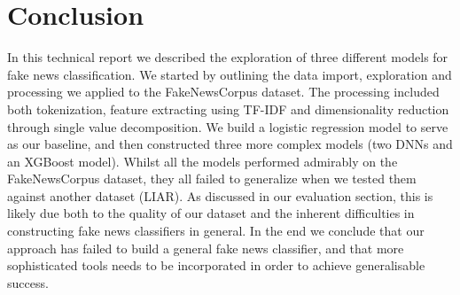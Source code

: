 \section{Conclusion}
In this technical report we described the exploration of three different models for fake news classification. We started
by outlining the data import, exploration and processing we applied to the FakeNewsCorpus dataset. The processing
included both tokenization, feature extracting using TF-IDF and dimensionality reduction through single value
decomposition. We build a logistic regression model to serve as our baseline, and then constructed three more complex
models (two DNNs and an XGBoost model). Whilst all the models performed admirably on the FakeNewsCorpus dataset, they
all failed to generalize when we tested them against another dataset (LIAR). As discussed in our evaluation section,
this is likely due both to the quality of our dataset and the inherent difficulties in constructing fake news
classifiers in general. In the end we conclude that our approach has failed to build a general fake news classifier, and
that more sophisticated tools needs to be incorporated in order to achieve generalisable success.

